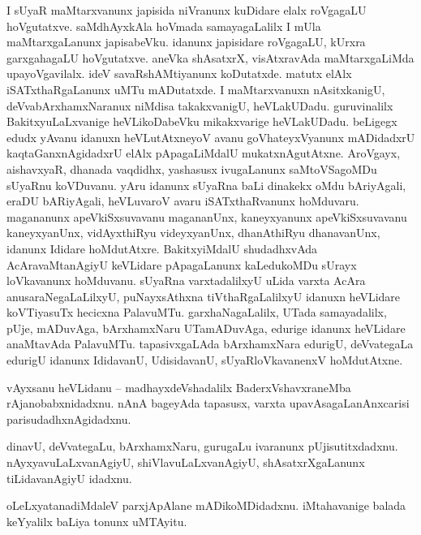 \documentclass{article}
\begin{document}
\begin{mng}%
I sUyaR maMtarxvanunx japisida niVranunx kuDidare elalx roVgagaLU hoVgutatxve. saMdhAyxkAla 
hoVmada samayagaLalilx I mUla maMtarxgaLanunx japisabeVku. idanunx japisidare roVgagaLU, kUrxra 
garxgahagaLU hoVgutatxve. aneVka shAsatxrX, visAtxravAda maMtarxgaLiMda upayoVgavilalx. ideV 
savaRshAMtiyanunx koDutatxde. matutx elAlx iSATxthaRgaLanunx uMTu mADutatxde. I maMtarxvanuxn 
nAsitxkanigU, deVvabArxhamxNaranux niMdisa takakxvanigU, heVLakUDadu. guruvinalilx 
BakitxyuLaLxvanige heVLikoDabeVku mikakxvarige heVLakUDadu. beLigegx edudx yAvanu idanuxn 
heVLutAtxneyoV avanu goVhateyxVyanunx mADidadxrU kaqtaGanxnAgidadxrU elAlx pApagaLiMdalU 
mukatxnAgutAtxne. AroVgayx, aishavxyaR, dhanada vaqdidhx, yashasusx ivugaLanunx saMtoVSagoMDu 
sUyaRnu koVDuvanu. yAru idanunx sUyaRna baLi dinakekx oMdu bAriyAgali, eraDU bARiyAgali, 
heVLuvaroV avaru iSATxthaRvanunx hoMduvaru. magananunx apeVkiSxsuvavanu magananUnx, kaneyxyanunx 
apeVkiSxsuvavanu kaneyxyanUnx, vidAyxthiRyu videyxyanUnx, dhanAthiRyu dhanavanUnx, idanunx 
Ididare hoMdutAtxre. BakitxyiMdalU shudadhxvAda AcAravaMtanAgiyU keVLidare pApagaLanunx 
kaLedukoMDu sUrayx loVkavanunx hoMduvanu. sUyaRna varxtadalilxyU uLida varxta AcAra 
anusaraNegaLaLilxyU, puNayxsAthxna tiVthaRgaLalilxyU idanuxn heVLidare koVTiyasuTx hecicxna 
PalavuMTu. garxhaNagaLalilx, UTada samayadalilx, pUje, mADuvAga, bArxhamxNaru UTamADuvAga, 
edurige idanunx heVLidare anaMtavAda PalavuMTu. tapasivxgaLAda bArxhamxNara edurigU, deVvategaLa 
edurigU idanunx IdidavanU, UdisidavanU, sUyaRloVkavanenxV hoMdutAtxne.
\end{mng}


\begin{mng}%
vAyxsanu heVLidanu -- madhayxdeVshadalilx BaderxVshavxraneMba rAjanobabxnidadxnu. nAnA bageyAda 
tapasusx, varxta upavAsagaLanAnxcarisi parisudadhxnAgidadxnu.
\end{mng}

\begin{mng}%
dinavU, deVvategaLu, bArxhamxNaru, gurugaLu ivaranunx pUjisutitxdadxnu. nAyxyavuLaLxvanAgiyU, 
shiVlavuLaLxvanAgiyU, shAsatxrXgaLanunx tiLidavanAgiyU idadxnu.
\end{mng}

\begin{mng}%
oLeLxyatanadiMdaleV parxjApAlane mADikoMDidadxnu. iMtahavanige balada keYyalilx baLiya tonunx 
uMTAyitu.
\end{mng}
\end{document}

